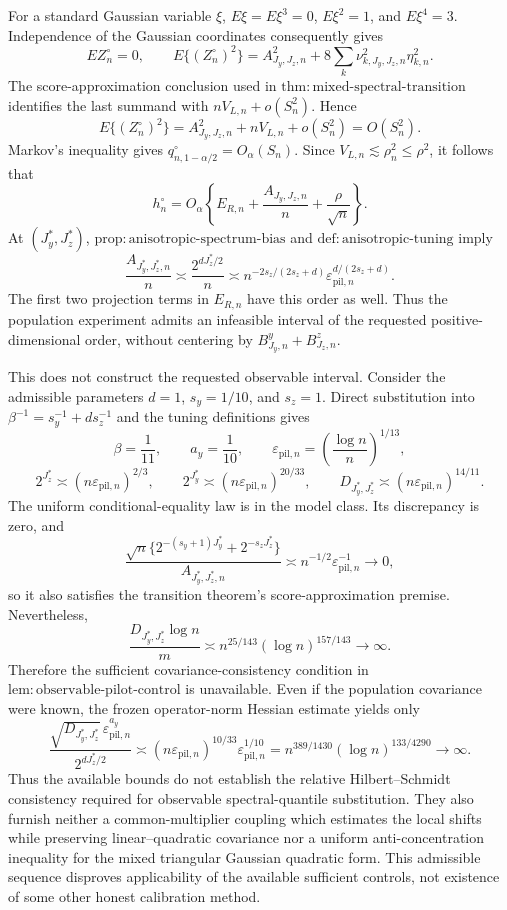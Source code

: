 For a standard Gaussian variable \(\xi\),
\(E\xi=E\xi^3=0\), \(E\xi^2=1\), and \(E\xi^4=3\).  Independence of the Gaussian coordinates consequently gives
\[
E Z_n^\circ=0,\qquad
E\{(Z_n^\circ)^2\}
=A_{J_y,J_z,n}^2+
8\sum_k\nu_{k,J_y,J_z,n}^2\eta_{k,n}^2.
\]
The score-approximation conclusion used in
\(\mathrm{thm{:}mixed\text{-}spectral\text{-}transition}\) identifies the last summand with
\(nV_{L,n}+o(S_n^2)\).  Hence
\[
E\{(Z_n^\circ)^2\}
=A_{J_y,J_z,n}^2+nV_{L,n}+o(S_n^2)=O(S_n^2).
\]
Markov's inequality gives
\(q_{n,1-\alpha/2}^\circ=O_\alpha(S_n)\).  Since
\(V_{L,n}\lesssim\rho_n^2\le\rho^2\), it follows that
\[
h_n^\circ=O_\alpha\!\left\{
E_{R,n}+\frac{A_{J_y,J_z,n}}n+\frac{\rho}{\sqrt n}
\right\}.
\]
At \((J_y^*,J_z^*)\),
\(\mathrm{prop{:}anisotropic\text{-}spectrum\text{-}bias}\) and
\(\mathrm{def{:}anisotropic\text{-}tuning}\) imply
\[
\frac{A_{J_y^*,J_z^*,n}}n
\asymp\frac{2^{dJ_z^*/2}}n
\asymp n^{-2s_z/(2s_z+d)}
\varepsilon_{\mathrm{pil},n}^{d/(2s_z+d)}.
\]
The first two projection terms in \(E_{R,n}\) have this order as well.  Thus the population experiment admits an infeasible interval of the requested positive-dimensional order, without centering by \(B^y_{J_y,n}+B^z_{J_z,n}\).

This does not construct the requested observable interval.  Consider the admissible parameters
\(d=1\), \(s_y=1/10\), and \(s_z=1\).  Direct substitution into
\(\beta^{-1}=s_y^{-1}+ds_z^{-1}\) and the tuning definitions gives
\[
\beta=\frac1{11},\qquad a_y=\frac1{10},\qquad
\varepsilon_{\mathrm{pil},n}
=\left(\frac{\log n}{n}\right)^{1/13},
\]
\[
2^{J_z^*}\asymp(n\varepsilon_{\mathrm{pil},n})^{2/3},
\qquad
2^{J_y^*}\asymp(n\varepsilon_{\mathrm{pil},n})^{20/33},
\qquad
D_{J_y^*,J_z^*}\asymp
(n\varepsilon_{\mathrm{pil},n})^{14/11}.
\]
The uniform conditional-equality law is in the model class.  Its discrepancy is zero, and
\[
\frac{\sqrt n\{2^{-(s_y+1)J_y^*}+2^{-s_zJ_z^*}\}}
{A_{J_y^*,J_z^*,n}}
\asymp n^{-1/2}\varepsilon_{\mathrm{pil},n}^{-1}\longrightarrow0,
\]
so it also satisfies the transition theorem's score-approximation premise.  Nevertheless,
\[
\frac{D_{J_y^*,J_z^*}\log n}{m}
\asymp n^{25/143}(\log n)^{157/143}\longrightarrow\infty.
\]
Therefore the sufficient covariance-consistency condition in
\(\mathrm{lem{:}observable\text{-}pilot\text{-}control}\) is unavailable.  Even if the population covariance were known, the frozen operator-norm Hessian estimate yields only
\[
\frac{\sqrt{D_{J_y^*,J_z^*}}\,
\varepsilon_{\mathrm{pil},n}^{a_y}}
{2^{dJ_z^*/2}}
\asymp(n\varepsilon_{\mathrm{pil},n})^{10/33}
\varepsilon_{\mathrm{pil},n}^{1/10}
=n^{389/1430}(\log n)^{133/4290}\longrightarrow\infty.
\]
Thus the available bounds do not establish the relative Hilbert--Schmidt consistency required for observable spectral-quantile substitution.  They also furnish neither a common-multiplier coupling which estimates the local shifts while preserving linear--quadratic covariance nor a uniform anti-concentration inequality for the mixed triangular Gaussian quadratic form.  This admissible sequence disproves applicability of the available sufficient controls, not existence of some other honest calibration method.

